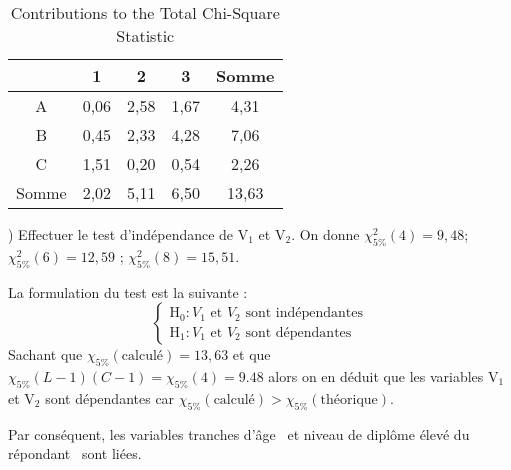 \begin{table}[htbp]
	\centering
	\begin{tabular}{c|c|c|c|c}
		\cline{2-5}
		& 1      & 2      & 3      & Somme \\ \hline
		A      & 0,06   & 2,58   & 1,67   & 4,31 \\ \hline
		B      & 0,45   & 2,33   & 4,28   & 7,06 \\ \hline
		C      & 1,51   & 0,20   & 0,54   & 2,26 \\ \hline
		Somme  & 2,02   & 5,11   & 6,50   & 13,63 \\ \hline
	\end{tabular}%
	\caption{Contributions to the Total Chi-Square Statistic}
\end{table}%

	
	) Effectuer le test d’indépendance de V$_{1}$ et V$_{2}$. On donne $\chi_{5\%}^2 (4) = 9,48$; $\chi_{5\%}^2 (6) = 12,59$  ; $\chi_{5\%}^2 (8) = 15,51.$

La formulation du test est la suivante : 
\[
\begin{cases}
	\text{H}_0 : \text{$V_1$ et $V_2$ sont indépendantes}\\
	\text{H}_1 : \text{$V_1$ et $V_2$ sont dépendantes}
\end{cases}
\]
Sachant que $\displaystyle \chi_{5\%}({\text{calculé}})=13,63$ et que $\displaystyle \chi_{5\%} (L-1)(C-1)= \chi_{5\%} (4)=9.48$ alors on en déduit que les variables V$_1$ et V$_2$ sont dépendantes car $\displaystyle \chi_{5\%}({\text{calculé}}) > \chi_{5\%} (\text{théorique})$.

Par conséquent, les variables \guillemetleft tranches d'âge \guillemetright\ et \guillemetleft niveau de diplôme élevé du répondant \guillemetright\ sont liées.

	\noindent \textbf{}
	